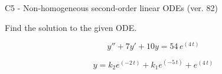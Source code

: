 \begin{exercise}
  \begin{exerciseTitle}C5 - Non-homogeneous second-order linear ODEs (ver. 82)\end{exerciseTitle}
  \begin{exerciseStatement}
    
Find the solution to the given ODE.

    
\[y''+7y'+10y = 54 \, e^{\left(4 \, t\right)}\]

  \end{exerciseStatement}
  \begin{exerciseAnswer}
    
\[y= k_{2} e^{\left(-2 \, t\right)} + k_{1} e^{\left(-5 \, t\right)} + e^{\left(4 \, t\right)}\]

  \end{exerciseAnswer}
\end{exercise}